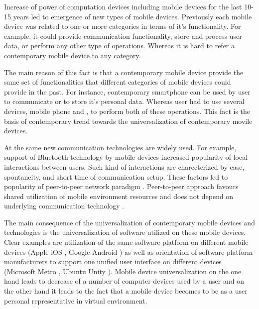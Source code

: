 %
Increase of power of computation devices including mobile devices for the last 10-15 years led to \The emergence of new types of mobile devices. 
%
Previously each mobile device was related to one or more categories in terms of it's functionality. 
%
For example, it could provide communication functionality, store and process user data, or perform any other type of operations. 
%
Whereas it is hard to refer a contemporary mobile device to any category. 

%
The main reason of this fact is that a contemporary mobile device provide the same set of functionalities that different categories of mobile devices could provide in the past. 
%
For instance, contemporary smartphone can be used by \A user to communicate or to store it's personal data. 
%
Whereas \A user had to use several devices, mobile phone and , to perform both of these operations. 
%
This fact is the basis of \The contemporary trend towards the universalization of contemporary movile devices. 

%
At the same new communication technologies are widely used. 
%
For example, support of Bluetooth  technology by mobile devices increased popularity of local interactions between users. 
%
Such kind of interactions are charecterized by ease, spontaneity, and short time of communication setup. 
%
These factors led to popularity of peer-to-peer network paradigm . 
%
Peer-to-peer approach favours shared utilization of mobile environment resources and does not depend on underlying communication technology  . 

%
The main consequence of the universalization of contemporary mobile devices and technologies is the universalization of software utilized on these mobile devices. 
%
Clear examples are utilization of the same software platform on different mobile devices (Apple iOS , Google Android ) as well as orientation of software platform manufacturers to support one unified user interface on different devices (Microsoft Metro , Ubuntu Unity ). 
%
Mobile device universalization on the one hand leads to decrease of a number of computer devices used by a user and on the other hand it leads to the fact that a mobile device becomes to be as a user personal representative in virtual environment. 

